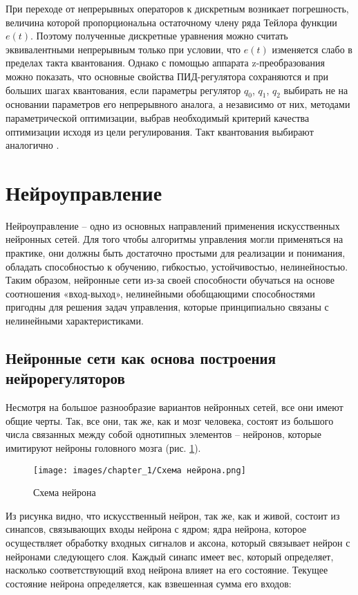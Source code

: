 При переходе от непрерывных операторов к дискретным возникает погрешность, величина которой пропорциональна остаточному члену ряда Тейлора функции $e\left(t\right)$. Поэтому полученные дискретные уравнения можно считать эквивалентными непрерывным только при условии, что $e\left(t\right)$ изменяется слабо в пределах такта квантования. Однако с помощью аппарата z-преобразования можно показать, что основные свойства ПИД-регулятора сохраняются и при больших шагах квантования, если параметры регулятор $q_0$, $q_1$, $q_2$ выбирать не на основании параметров его непрерывного аналога, а независимо от них, методами параметрической оптимизации, выбрав необходимый критерий качества оптимизации исходя из цели регулирования. Такт квантования выбирают аналогично \cite{PID_NIL_AP}.

\section{Нейроуправление}

Нейроуправление – одно из основных направлений применения искусственных нейронных сетей. Для того чтобы алгоритмы управления могли применяться на практике, они должны быть достаточно простыми для реализации и понимания, обладать способностью к обучению, гибкостью, устойчивостью, нелинейностью. Таким образом, нейронные сети из-за своей способности обучаться на основе соотношения «вход-выход», нелинейными обобщающими способностями пригодны для решения задач управления, которые принципиально связаны с нелинейными характеристиками.

\subsection{Нейронные сети как основа построения нейрорегуляторов}

Несмотря на большое разнообразие вариантов нейронных сетей, все они имеют общие черты. Так, все они, так же, как и мозг человека, состоят из большого числа связанных между собой однотипных элементов – нейронов, которые имитируют нейроны головного мозга (рис. \ref{fig:neuron_scheme}).

\begin{figure}[H]
    \centering
    \texttt{[image: images/chapter\_1/Схема нейрона.png]}
    \caption{Схема нейрона}
    \label{fig:neuron_scheme}
\end{figure}

Из рисунка видно, что искусственный нейрон, так же, как и живой, состоит из синапсов, связывающих входы нейрона с ядром; ядра нейрона, которое осуществляет обработку входных сигналов и аксона, который связывает нейрон с нейронами следующего слоя. Каждый синапс имеет вес, который определяет, насколько соответствующий вход нейрона влияет на его состояние. Текущее состояние нейрона определяется, как взвешенная сумма его входов:

